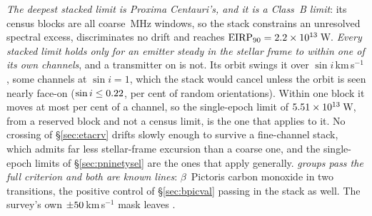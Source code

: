 \emph{The deepest stacked limit is Proxima Centauri's, and it is a Class~B
limit}: its \SxProxEbCensus{} census blocks are all coarse \ChanBModeMHz\,MHz
windows, so the stack constrains an unresolved spectral excess, discriminates
no drift and reaches $\mathrm{EIRP}_{90}=2.2\times10^{13}$\,W. \emph{Every
stacked limit holds only for an emitter steady in the stellar frame to within
one of its own channels}, and a transmitter on \PxPlanet{} is not. Its orbit
\citep{AngladaEscude2016,Kervella2017,NEA2013} swings it over
\PxPPKms$\sin i$\,km\,s$^{-1}$, some \PxNChanWalk{} channels at $\sin i=1$,
which the stack would cancel unless the orbit is seen nearly face-on
($\sin i\le0.22$, \PxIsoPct{} per cent of random orientations). Within one block it moves at most \PxBlockPct{} per cent of a channel, so the
single-epoch limit of $5.51 \times 10^{13}$\,W, from a reserved block and not a
census limit, is the one that applies to it. No crossing of
\S\ref{sec:etacrv} drifts slowly enough to survive a fine-channel stack,
which admits far less stellar-frame excursion than a coarse one, and the
single-epoch limits of \S\ref{sec:pninetysel} are
the ones that apply generally. \emph{\StkNSurvive{} groups pass the full
criterion and both are known lines}: $\beta$~Pictoris carbon monoxide in two
transitions, the positive control of \S\ref{sec:bpicval} passing in the stack
as well. The survey's own $\pm50$\,km\,s$^{-1}$ mask leaves
\StkUnattrClause.

